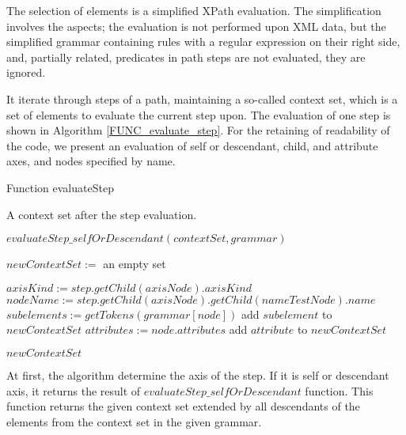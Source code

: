 The selection of elements is a simplified XPath evaluation. The simplification involves the aspects; the evaluation is not performed upon XML data, but the simplified grammar containing rules with a regular expression on their right side, and, partially related, predicates in path steps are not evaluated, they are ignored.

It iterate through steps of a path, maintaining a so-called context set, which is a set of elements to evaluate the current step upon. The evaluation of one step is shown in Algorithm \ref{FUNC_evaluate_step}. For the retaining of readability of the code, we present an evaluation of self or descendant, child, and attribute axes, and nodes specified by name.

\begin{algorithm}
\caption{Function evaluateStep}
\label{FUNC_evaluate_step}
\begin{algorithmic}[1]

\ENSURE A context set after the step evaluation.

	\RETURN $evaluateStep\_selfOrDescendant(contextSet, grammar)$
\ENDIF

\STATE $newContextSet :=$ an empty set

\STATE $axisKind := step.getChild(axisNode).axisKind$
\STATE $nodeName := step.getChild(axisNode).getChild(nameTestNode).name$
			\STATE $subelements := getTokens(grammar[node])$
					\STATE add $subelement$ to $newContextSet$
				\ENDIF
			\ENDFOR
		\ENDIF
	\ENDFOR
{}
			\STATE $attributes := node.attributes$
					\STATE add $attribute$ to $newContextSet$
				\ENDIF
			\ENDFOR
		\ENDIF
	\ENDFOR
\ENDIF

\RETURN $newContextSet$
\end{algorithmic}
\end{algorithm}

At first, the algorithm determine the axis of the step. If it is self or descendant axis, it returns the result of $evaluateStep\_selfOrDescendant$ function. This function returns the given context set extended by all descendants of the elements from the context set in the given grammar.

